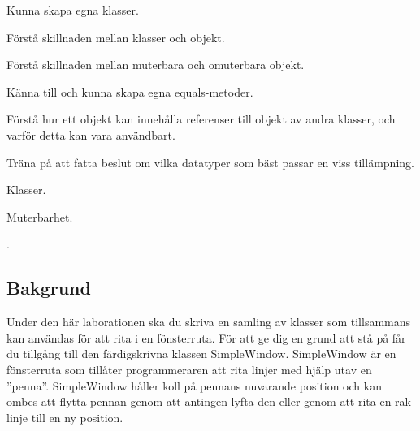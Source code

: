 

\Lab{\LabWeekSIX}

\begin{Goals}
\item Kunna skapa egna klasser.
\item Förstå skillnaden mellan klasser och objekt.
\item Förstå skillnaden mellan muterbara och omuterbara objekt.
\item Känna till och kunna skapa egna equals-metoder.
\item Förstå hur ett objekt kan innehålla referenser till objekt av andra klasser, och varför detta kan vara användbart.
\item Träna på att fatta beslut om vilka datatyper som bäst passar en viss tillämpning.
\end{Goals}

\begin{Preparations}
\item Klasser.
\item Muterbarhet.
\item .


\end{Preparations}

\subsection{Bakgrund}

Under den här laborationen ska du skriva en samling av klasser som tillsammans kan användas för att rita i en fönsterruta. För att ge dig en grund att stå på får du tillgång till den färdigskrivna klassen SimpleWindow. SimpleWindow är en fönsterruta som tillåter programmeraren att rita linjer med hjälp utav en  ''penna''. SimpleWindow håller koll på pennans nuvarande position och kan ombes att flytta pennan genom att antingen lyfta den eller genom att rita en rak linje till en ny position.

